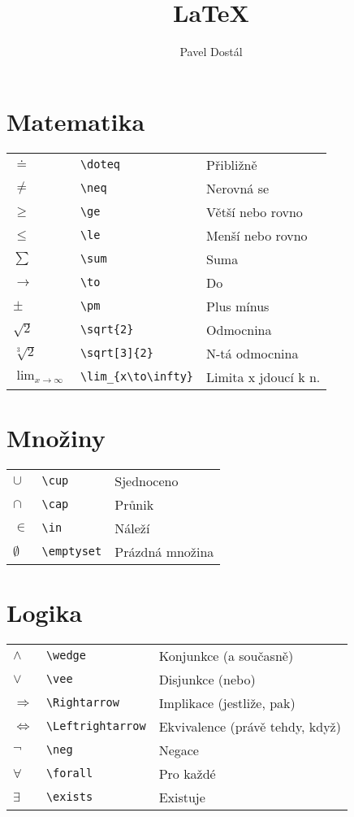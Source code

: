 \documentclass{article}
\title{LaTeX}
\author{Pavel Dostál}
\newcommand{\dlim}{\displaystyle\lim}
\begin{document}
	\pagestyle{empty}
	\begin{multicols}{2}
		\section{Matematika}
		\begin{tabular}{lll}
			$\doteq$		&	\verb|\doteq|		&	Přibližně			\\
			$\neq$		&	\verb|\neq|			&	Nerovná se		\\
			$\ge$		&	\verb|\ge|			&	Větší nebo rovno	\\
			$\le$			&	\verb|\le|			&	Menší nebo rovno	\\
			$\sum$		&	\verb|\sum|		&	Suma			\\
			$\to$			&	\verb|\to|			&	Do				\\
			$\pm$		&	\verb|\pm|			&	Plus mínus		\\
			$\sqrt{2}$		&	\verb|\sqrt{2}|		&	Odmocnina		\\
			$\sqrt[3]{2}$	&	\verb|\sqrt[3]{2}|		&	N-tá odmocnina		\\
			$\dlim_{x\rightarrow\infty}$
						&	\verb|\lim_{x\to\infty}|
											&	Limita x jdoucí k n.	\\
		\end{tabular}
		\section{Množiny}
		\begin{tabular}{lll}
			$\cup$		&	\verb|\cup|			&	Sjednoceno		\\
			$\cap$		&	\verb|\cap|			&	Průnik			\\
			$\in$			&	\verb|\in|			&	Náleží			\\
			$\emptyset$	&	\verb|\emptyset|		&	Prázdná množina	\\
		\end{tabular}
		\section{Logika}
		\begin{tabular}{lll}
			$\wedge$			&	\verb|\wedge|		&	Konjunkce (a současně)		\\
			$\vee$			&	\verb|\vee|			&	Disjunkce (nebo)			\\
			$\Rightarrow$		&	\verb|\Rightarrow|	&	Implikace (jestliže, pak)		\\
			$\Leftrightarrow$	&	\verb|\Leftrightarrow|	&	Ekvivalence (právě tehdy, když)	\\
			$\neg$			&	\verb|\neg|			&	Negace					\\
			$\forall$			&	\verb|\forall|		&	Pro každé					\\
			$\exists$			&	\verb|\exists|		&	Existuje 
		\end{tabular}
		\columnbreak

\end{multicols}
\end{document}
